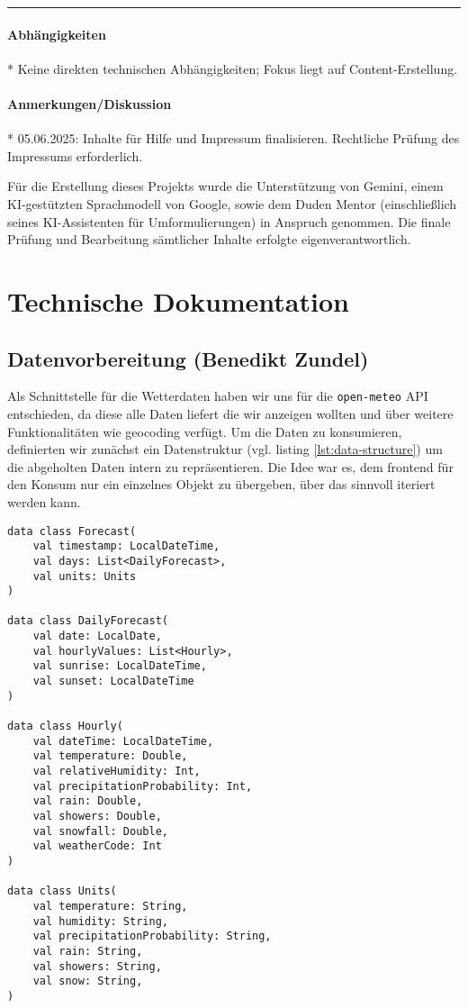 \documentclass{article}
\begin{document}
\vspace{0.5em}
\hrule

\paragraph{Abhängigkeiten}
* Keine direkten technischen Abhängigkeiten; Fokus liegt auf Content-Erstellung.

\paragraph{Anmerkungen/Diskussion}
* 05.06.2025: Inhalte für Hilfe und Impressum finalisieren. Rechtliche Prüfung des Impressums erforderlich.

\vfill
\small 
Für die Erstellung dieses Projekts wurde die Unterstützung von Gemini, einem KI-gestützten Sprachmodell von Google, sowie dem Duden Mentor (einschließlich seines KI-Assistenten für Umformulierungen) in Anspruch genommen. Die finale Prüfung und Bearbeitung sämtlicher Inhalte erfolgte eigenverantwortlich.
\normalsize


\newpage

\section{Technische Dokumentation}
\subsection{Datenvorbereitung \small{(Benedikt Zundel)}}

Als Schnittstelle für die Wetterdaten haben wir uns für die \texttt{open-meteo} \cite{open-meteo} API entschieden, da diese alle Daten liefert die wir anzeigen wollten und über weitere Funktionalitäten wie geocoding verfügt. Um die Daten zu konsumieren, definierten wir zunächst ein Datenstruktur (vgl. listing \ref{lst:data-structure}) um die abgeholten Daten intern zu repräsentieren. Die Idee war es, dem frontend für den Konsum nur ein einzelnes Objekt zu übergeben, über das sinnvoll iteriert werden kann.

\begin{lstlisting}[label=lst:data-structure, caption=Forecast Datenstruktur]
data class Forecast(
    val timestamp: LocalDateTime,
    val days: List<DailyForecast>,
    val units: Units
)

data class DailyForecast(
    val date: LocalDate,
    val hourlyValues: List<Hourly>,
    val sunrise: LocalDateTime,
    val sunset: LocalDateTime
)

data class Hourly(
    val dateTime: LocalDateTime,
    val temperature: Double,
    val relativeHumidity: Int,
    val precipitationProbability: Int,
    val rain: Double,
    val showers: Double,
    val snowfall: Double,
    val weatherCode: Int
)

data class Units(
    val temperature: String,
    val humidity: String,
    val precipitationProbability: String,
    val rain: String,
    val showers: String,
    val snow: String,
)
\end{lstlisting}
\end{document}
